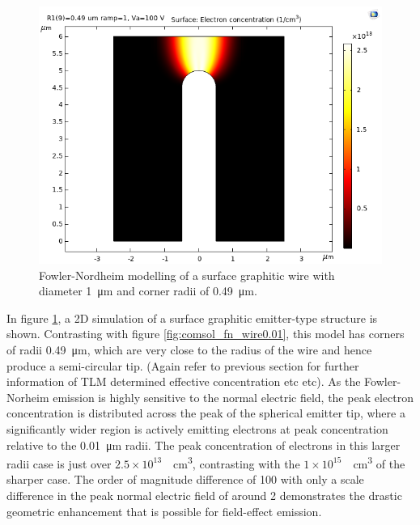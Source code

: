 \begin{refsection}
\begin{figure}[H]
    \centering
    \includegraphics[width=\textwidth]{Chapter7/Figs/Raster/FN radius 0.49 width 1um 100V 0V.png}
    \caption{Fowler-Nordheim modelling of a surface graphitic wire with diameter 1~\si{\micro\metre} and corner radii of 0.49~\si{\micro\metre}.}
    \label{fig:comsol_fn_wire0.49}
\end{figure}

In figure \ref{fig:comsol_fn_wire0.49}, a 2D simulation of a surface graphitic emitter-type structure is shown. Contrasting with figure \ref{fig:comsol_fn_wire0.01}, this model has corners of radii 0.49~\si{\micro\metre}, which are very close to the radius of the wire and hence produce a semi-circular tip. (Again refer to previous section for further information of TLM determined effective concentration etc etc). As the Fowler-Norheim emission is highly sensitive to the normal electric field, the peak electron concentration is distributed across the peak of the spherical emitter tip, where a significantly wider region is actively emitting electrons at peak concentration relative to the 0.01~\si{\micro\metre} radii. The peak concentration of electrons in this larger radii case is just over $2.5\times10^{13}$~\si{\per\centi\metre\cubed}, contrasting with the $1\times10^{15}$~\si{\per\centi\metre\cubed} of the sharper case. The order of magnitude difference of 100 with only a scale difference in the peak normal electric field of around 2 demonstrates the drastic geometric enhancement that is possible for field-effect emission.

\end{refsection}
